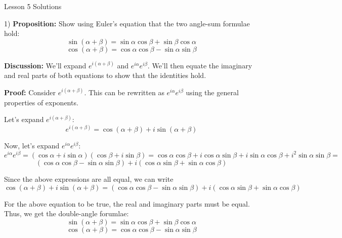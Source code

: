 


    \begin{center}
        \huge\sc Lesson 5 Solutions
    \end{center}

    \begin{paragraph}{1)}
        \textbf{Proposition:} Show using Euler's equation that the two angle-sum formulae hold:
        $$\sin(\alpha + \beta) = \sin\alpha\cos\beta + \sin\beta\cos\alpha$$
        $$\cos(\alpha + \beta) = \cos\alpha\cos\beta - \sin\alpha\sin\beta$$
        \spacing        

        \textbf{Discussion:} We'll expand $e^{i(\alpha + \beta)}$
        and $e^{i\alpha}e^{i\beta}$. We'll then equate the imaginary and real
        parts of both equations to show that the identities hold.
        \spacing

        \textbf{Proof:} Consider $e^{i(\alpha + \beta)}$. This can be rewritten as 
        $e^{i\alpha}e^{i\beta}$ using the general properties of exponents.
        \spacing

        Let's expand $e^{i(\alpha + \beta)}$:
        $$e^{i(\alpha + \beta)} = \cos(\alpha + \beta) + i\sin(\alpha + \beta)$$
        \spacing

        Now, let's expand $e^{i\alpha}e^{i\beta}$:
        $$e^{i\alpha}e^{i\beta} = (\cos\alpha + i\sin\alpha)(\cos\beta + i\sin\beta) = \cos\alpha\cos\beta + i\cos\alpha\sin\beta + i\sin\alpha\cos\beta + i^2\sin\alpha\sin\beta = $$
        $$(\cos\alpha\cos\beta - \sin\alpha\sin\beta) + i(\cos\alpha\sin\beta + \sin\alpha\cos\beta)$$
        \spacing

        Since the above expressions are all equal, we can write
        $$\cos(\alpha + \beta) + i\sin(\alpha + \beta) = (\cos\alpha\cos\beta - \sin\alpha\sin\beta) + i(\cos\alpha\sin\beta + \sin\alpha\cos\beta)$$
        \spacing

        For the above equation to be true, the real and imaginary parts must be equal. Thus, we get the double-angle forumlae:
        $$\sin(\alpha + \beta) = \sin\alpha\cos\beta + \sin\beta\cos\alpha$$
        $$\cos(\alpha + \beta) = \cos\alpha\cos\beta - \sin\alpha\sin\beta$$
        \proofEnd
    \end{paragraph}

    \bigskip

